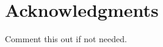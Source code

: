 \section*{Acknowledgments}
Comment this out if not needed.

\clearpage{\pagestyle{empty}\cleardoublepage}
